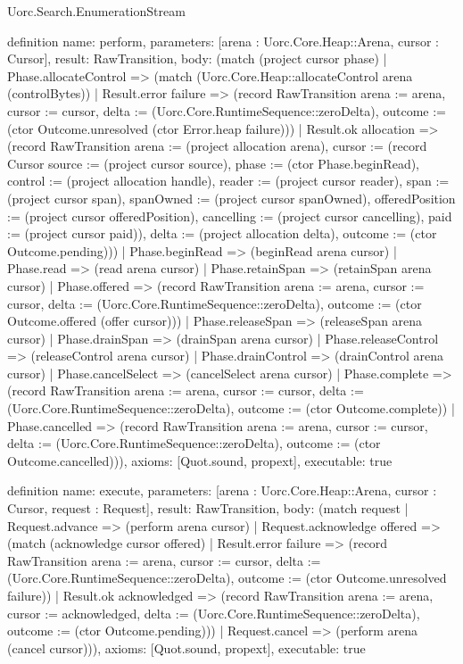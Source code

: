 \begin{lexlean}{Uorc.Search.EnumerationStream}
\begin{semanticmodule}
definition{
  name: perform,
  parameters: [arena : Uorc.Core.Heap::Arena, cursor : Cursor],
  result: RawTransition,
  body: (match (project cursor phase)
    | Phase.allocateControl => (match (Uorc.Core.Heap::allocateControl arena (controlBytes))
      | Result.error failure => (record RawTransition {arena := arena, cursor := cursor, delta := (Uorc.Core.RuntimeSequence::zeroDelta), outcome := (ctor Outcome.unresolved (ctor Error.heap failure))})
      | Result.ok allocation => (record RawTransition {arena := (project allocation arena), cursor := (record Cursor {source := (project cursor source), phase := (ctor Phase.beginRead), control := (project allocation handle), reader := (project cursor reader), span := (project cursor span), spanOwned := (project cursor spanOwned), offeredPosition := (project cursor offeredPosition), cancelling := (project cursor cancelling), paid := (project cursor paid)}), delta := (project allocation delta), outcome := (ctor Outcome.pending)}))
    | Phase.beginRead => (beginRead arena cursor)
    | Phase.read => (read arena cursor)
    | Phase.retainSpan => (retainSpan arena cursor)
    | Phase.offered => (record RawTransition {arena := arena, cursor := cursor, delta := (Uorc.Core.RuntimeSequence::zeroDelta), outcome := (ctor Outcome.offered (offer cursor))})
    | Phase.releaseSpan => (releaseSpan arena cursor)
    | Phase.drainSpan => (drainSpan arena cursor)
    | Phase.releaseControl => (releaseControl arena cursor)
    | Phase.drainControl => (drainControl arena cursor)
    | Phase.cancelSelect => (cancelSelect arena cursor)
    | Phase.complete => (record RawTransition {arena := arena, cursor := cursor, delta := (Uorc.Core.RuntimeSequence::zeroDelta), outcome := (ctor Outcome.complete)})
    | Phase.cancelled => (record RawTransition {arena := arena, cursor := cursor, delta := (Uorc.Core.RuntimeSequence::zeroDelta), outcome := (ctor Outcome.cancelled)})),
  axioms: [Quot.sound, propext],
  executable: true
}

definition{
  name: execute,
  parameters: [arena : Uorc.Core.Heap::Arena, cursor : Cursor, request : Request],
  result: RawTransition,
  body: (match request
    | Request.advance => (perform arena cursor)
    | Request.acknowledge offered => (match (acknowledge cursor offered)
      | Result.error failure => (record RawTransition {arena := arena, cursor := cursor, delta := (Uorc.Core.RuntimeSequence::zeroDelta), outcome := (ctor Outcome.unresolved failure)})
      | Result.ok acknowledged => (record RawTransition {arena := arena, cursor := acknowledged, delta := (Uorc.Core.RuntimeSequence::zeroDelta), outcome := (ctor Outcome.pending)}))
    | Request.cancel => (perform arena (cancel cursor))),
  axioms: [Quot.sound, propext],
  executable: true
}


\end{semanticmodule}
\end{lexlean}
